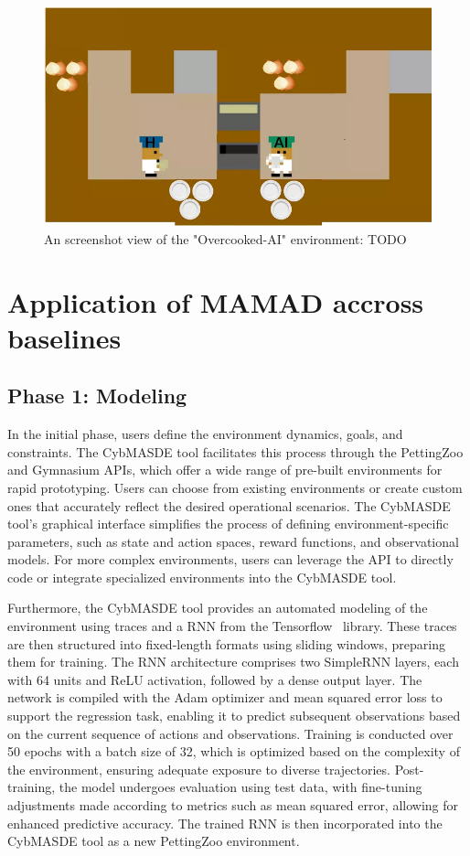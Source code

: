 \documentclass[pdflatex,sn-mathphys-num]{sn-jnl}%
\theoremstyle{thmstyleone}%
\theoremstyle{thmstyletwo}%
\theoremstyle{thmstylethree}%
\begin{document}
  \begin{figure}[h!]
    \centering
    \includegraphics[width=0.7\linewidth]{figures/overcooked.png}
    \caption{An screenshot view of the "Overcooked-AI" environment: TODO}
    \label{fig:overcooked}
  \end{figure}

\section{Application of MAMAD accross baselines}\label{sec:case_study_application}

\subsection{Phase 1: Modeling}

In the initial phase, users define the environment dynamics, goals, and constraints. The CybMASDE tool facilitates this process through the PettingZoo and Gymnasium APIs, which offer a wide range of pre-built environments for rapid prototyping. Users can choose from existing environments or create custom ones that accurately reflect the desired operational scenarios. The CybMASDE tool's graphical interface simplifies the process of defining environment-specific parameters, such as state and action spaces, reward functions, and observational models. For more complex environments, users can leverage the API to directly code or integrate specialized environments into the CybMASDE tool.

Furthermore, the CybMASDE tool provides an automated modeling of the environment using traces and a RNN from the Tensorflow~\cite{tensorflow2015-whitepaper} library.
These traces are then structured into fixed-length formats using sliding windows, preparing them for training. The RNN architecture comprises two SimpleRNN layers, each with 64 units and ReLU activation, followed by a dense output layer. The network is compiled with the Adam optimizer and mean squared error loss to support the regression task, enabling it to predict subsequent observations based on the current sequence of actions and observations. Training is conducted over 50 epochs with a batch size of 32, which is optimized based on the complexity of the environment, ensuring adequate exposure to diverse trajectories. Post-training, the model undergoes evaluation using test data, with fine-tuning adjustments made according to metrics such as mean squared error, allowing for enhanced predictive accuracy. The trained RNN is then incorporated into the CybMASDE tool as a new PettingZoo environment.
\end{document}
